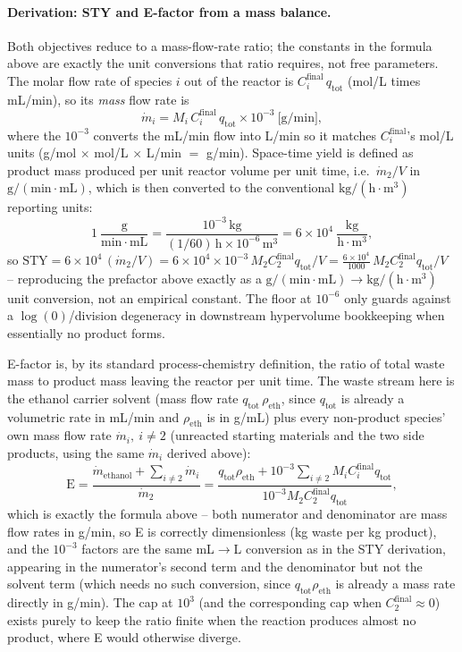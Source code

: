 \documentclass[11pt]{article}
\begin{document}
\paragraph{Derivation: STY and E-factor from a mass balance.} Both
objectives reduce to a mass-flow-rate ratio; the constants in the
formula above are exactly the unit conversions that ratio requires,
not free parameters. The molar flow rate of species $i$ out of the
reactor is $C_i^{\mathrm{final}}\,q_{\mathrm{tot}}$ (mol/L times
mL/min), so its \emph{mass} flow rate is
\[
\dot m_i = M_i\, C_i^{\mathrm{final}}\, q_{\mathrm{tot}} \times 10^{-3}\ \big[\mathrm{g/min}\big],
\]
where the $10^{-3}$ converts the mL/min flow into L/min so it matches
$C_i^{\mathrm{final}}$'s mol/L units (g/mol $\times$ mol/L $\times$
L/min $=$ g/min). Space-time yield is defined as product mass produced
per unit reactor volume per unit time, i.e.\ $\dot m_2 / V$ in
$\mathrm{g/(min\cdot mL)}$, which is then converted to the
conventional $\mathrm{kg/(h\cdot m^3)}$ reporting units:
\[
1\ \frac{\mathrm g}{\mathrm{min}\cdot\mathrm{mL}}
= \frac{10^{-3}\,\mathrm{kg}}{(1/60)\,\mathrm h \times 10^{-6}\,\mathrm m^3}
= 6\times10^{4}\ \frac{\mathrm{kg}}{\mathrm h\cdot\mathrm m^3},
\]
so $\mathrm{STY} = 6\times10^{4}\, (\dot m_2/V) = 6\times10^4\times10^{-3}\,
M_2 C_2^{\mathrm{final}} q_{\mathrm{tot}}/V = \tfrac{6\times10^4}{1000}\,
M_2 C_2^{\mathrm{final}} q_{\mathrm{tot}}/V$ -- reproducing the
prefactor above exactly as a $\mathrm{g/(min\cdot mL)} \to
\mathrm{kg/(h\cdot m^3)}$ unit conversion, not an empirical constant.
The floor at $10^{-6}$ only guards against a $\log(0)$/division
degeneracy in downstream hypervolume bookkeeping when essentially no
product forms.

E-factor is, by its standard process-chemistry definition, the ratio
of total waste mass to product mass leaving the reactor per unit time.
The waste stream here is the ethanol carrier solvent (mass flow rate
$q_{\mathrm{tot}}\,\rho_{\mathrm{eth}}$, since $q_{\mathrm{tot}}$ is
already a volumetric rate in mL/min and $\rho_{\mathrm{eth}}$ is in
g/mL) plus every non-product species' own mass flow rate
$\dot m_i,\ i \neq 2$ (unreacted starting materials and the two side
products, using the same $\dot m_i$ derived above):
\[
\mathrm{E} = \frac{\dot m_{\mathrm{ethanol}} + \sum_{i\neq 2}\dot m_i}{\dot m_2}
= \frac{q_{\mathrm{tot}}\rho_{\mathrm{eth}} + 10^{-3}\sum_{i\neq2} M_i C_i^{\mathrm{final}} q_{\mathrm{tot}}}{10^{-3} M_2 C_2^{\mathrm{final}} q_{\mathrm{tot}}},
\]
which is exactly the formula above -- both numerator and denominator
are mass flow rates in g/min, so E is correctly dimensionless (kg
waste per kg product), and the $10^{-3}$ factors are the same
mL$\to$L conversion as in the STY derivation, appearing in the
numerator's second term and the denominator but not the solvent term
(which needs no such conversion, since $q_{\mathrm{tot}}\rho_{\mathrm{eth}}$
is already a mass rate directly in g/min). The cap at $10^3$ (and the
corresponding cap when $C_2^{\mathrm{final}} \approx 0$) exists purely
to keep the ratio finite when the reaction produces almost no product,
where E would otherwise diverge.
\end{document}
